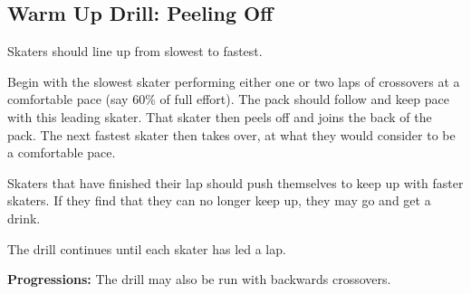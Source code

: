 \subsection*{Warm Up Drill: Peeling Off} 

Skaters should line up from slowest to fastest.

Begin with the slowest skater performing either one or two laps of crossovers at a comfortable pace (say 60\% of full effort).   
The pack should follow and keep pace with this leading skater.
That skater then peels off and joins the back of the pack. 
The next fastest skater then takes over, at what they would consider to be a comfortable pace.


Skaters that have finished their lap should push themselves to keep up with faster skaters.
If they find that they can no longer keep up, they may go and get a drink.

The drill continues until each skater has led a lap.

{\bf Progressions:} The drill may also be run with backwards crossovers. 

